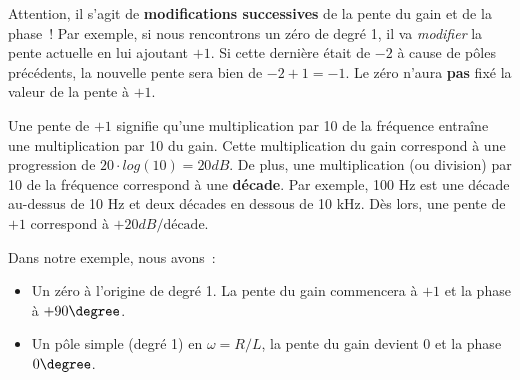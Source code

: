 Attention, il s'agit de \textbf{modifications successives} de la pente du gain et de la phase~!
Par exemple, si nous rencontrons un zéro de degré 1, il va \textit{modifier} la pente actuelle en lui ajoutant $+1$. Si cette dernière était de $-2$ à cause de pôles précédents, la nouvelle pente sera bien de $-2 + 1 = -1$. Le zéro n'aura \textbf{pas} fixé la valeur de la pente à $+1$.

Une pente de $+1$ signifie qu'une multiplication par 10 de la fréquence entraîne une multiplication par 10 du gain. Cette multiplication du gain correspond à une progression de $20\cdot log (10) = 20 dB$.
De plus, une multiplication (ou division) par 10 de la fréquence correspond à une \textbf{décade}. Par exemple, 100 Hz est une décade au-dessus de 10 Hz et deux décades en dessous de 10 kHz.
Dès lors, une pente de $+1$ correspond à $+20 dB/\mbox{décade}$.

Dans notre exemple, nous avons~:

\begin{itemize}
  \item Un zéro à l'origine de degré 1. La pente du gain commencera à $+1$ et la phase à $+90\degree$.
  \item Un pôle simple (degré 1) en $\omega = R/L$, la pente du gain devient $0$ et la phase $0\degree$.
\end{itemize}

\begin{center}
\end{center}

